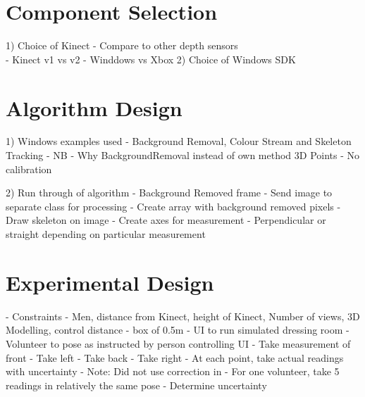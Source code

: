 \section{Component Selection}
1) Choice of Kinect - Compare to other depth sensors\\
- Kinect v1 vs v2
- Winddows vs Xbox
2) Choice of Windows SDK\\

\section{Algorithm Design}
1) Windows examples used - Background Removal, Colour Stream and Skeleton Tracking - NB - Why BackgroundRemoval instead of own method
3D Points - No calibration

2) Run through of algorithm
- Background Removed frame
- Send image to separate class for processing
- Create array with background removed pixels
- Draw skeleton on image
- Create axes for measurement - Perpendicular or straight depending on particular measurement

\section{Experimental Design}
- Constraints - Men, distance from Kinect, height of Kinect, Number of views, 3D Modelling, control distance - box of 0.5m
- UI to run simulated dressing room
- Volunteer to pose as instructed by person controlling UI
- Take measurement of front
- Take left
- Take back
- Take right 
- At each point, take actual readings with uncertainty
- Note: Did not use correction in \cite{nonContact2017}
- For one volunteer, take 5 readings in relatively the same pose - Determine uncertainty 